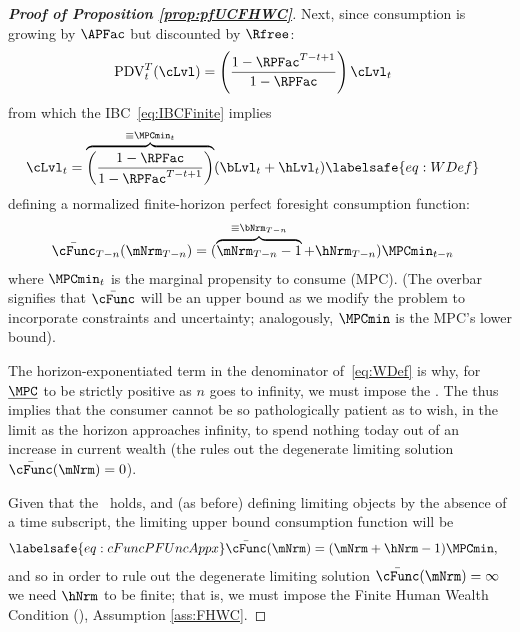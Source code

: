 \documentclass[\econtexRoot/BufferStockTheory]{subfiles}
\begin{document}
\begin{proof}[\textbf{Proof of Proposition \ref{prop:pfUCFHWC}}]
Next, since consumption is growing by $\APFac$ but discounted by $\Rfree$:
\begin{align*}
  \mathrm{PDV}_{t}^{T}(\cLvl)  & = \left(\frac{1-\RPFac^{T-t+1}}{1-\RPFac}\right)\cLvl_{t}
\end{align*}
from which the IBC~\eqref{eq:IBCFinite} implies
\begin{align}
  \cLvl_{t}  & = \overbrace{\left(\frac{1-\RPFac}{1-\RPFac^{T-t+1}}\right)}^{\equiv \MPCmin_{t}}
               (\bLvl_{t}+\hLvl_{t})   \labelsafe{eq:WDef}
\end{align}
defining a normalized finite-horizon perfect foresight consumption function:\hypertarget{MPCminDefn}{}
%
%
\begin{align*}
  \bar{\cFunc}_{T-n}(\mNrm_{T-n})  & = (\overbrace{\mNrm_{T-n}-1}^{
                                     \equiv\bNrm_{T-n}}+\hNrm_{T-n})\MPCmin_{t-n}
\end{align*}
%
%
where $\MPCmin_{t}$ is the marginal propensity to consume (MPC).
(The overbar signifies that $\bar{\cFunc}$ will be an upper bound as we modify the problem to incorporate constraints and uncertainty; analogously, $\MPCmin$ is the MPC's lower bound).


The horizon-exponentiated term in the denominator of~\eqref{eq:WDef} is why, for $\underline{\MPC}$ to be strictly positive as $n$ goes to infinity, we must impose the {\RIC}.
The {\RIC} thus implies that the consumer cannot be so pathologically patient as to wish, in the limit as the horizon approaches infinity, to spend nothing today out of an increase in current wealth (the {\RIC} rules out the degenerate limiting solution $\bar{\cFunc}(\mNrm)=0$).



\hypertarget{Unconstrained-Solution}{}\hypertarget{PF-Unconstrained-Solution}{}

Given that the {\RIC}~holds, and (as before) defining limiting objects by the absence of a time subscript, the limiting upper bound consumption function will be
\begin{align}\labelsafe{eq:cFuncPFUncAppx}
  \bar{\cFunc}(\mNrm)  & = (\mNrm+\hNrm-1)\MPCmin,
\end{align}
and so in order to rule out the degenerate limiting solution $\bar{\cFunc}(\mNrm) = \infty$ we need $\hNrm$ to be finite; that is, we must impose the Finite Human Wealth Condition ({\FHWC}), Assumption \eqref{ass:FHWC}.

\end{proof}
\end{document}
